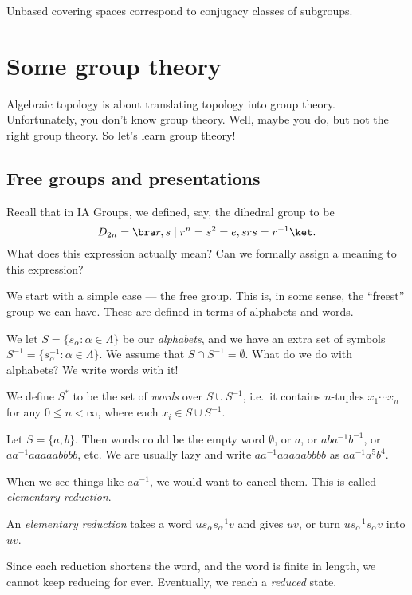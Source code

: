 \documentclass[a4paper]{article}
\begin{document}
\begin{prop}
  Unbased covering spaces correspond to conjugacy classes of subgroups.
\end{prop}

\section{Some group theory}
Algebraic topology is about translating topology into group theory. Unfortunately, you don't know group theory. Well, maybe you do, but not the right group theory. So let's learn group theory!

\subsection{Free groups and presentations}
Recall that in IA Groups, we defined, say, the dihedral group to be
\[
  D_{2n} = \bra r, s \mid r^n = s^2 = e, srs = r^{-1}\ket.
\]
What does this expression actually mean? Can we formally assign a meaning to this expression?

We start with a simple case --- the free group. This is, in some sense, the ``freest'' group we can have. These are defined in terms of alphabets and words.

\begin{defi}
 We let $S = \{s_\alpha: \alpha \in \Lambda\}$ be our \emph{alphabets}, and we have an extra set of symbols $S^{-1} = \{s_\alpha^{-1}: \alpha \in \Lambda\}$. We assume that $S\cap S^{-1} = \emptyset$. What do we do with alphabets? We write words with it!

 We define $S^*$ to be the set of \emph{words} over $S\cup S^{-1}$, i.e.\ it contains $n$-tuples $x_1 \cdots x_n$ for any $0 \leq n < \infty$, where each $x_i \in S \cup S^{-1}$.
\end{defi}

\begin{eg}
  Let $S = \{a, b\}$. Then words could be the empty word $\emptyset$, or $a$, or $aba^{-1}b^{-1}$, or $aa^{-1}aaaaabbbb$, etc. We are usually lazy and write $aa^{-1}aaaaabbbb$ as $aa^{-1}a^5 b^4$.
\end{eg}

When we see things like $aa^{-1}$, we would want to cancel them. This is called \emph{elementary reduction}.
\begin{defi}
  An \emph{elementary reduction} takes a word $us_\alpha s_\alpha^{-1}v$ and gives $uv$, or turn $us_\alpha^{-1}s_\alpha v$ into $uv$.
\end{defi}
Since each reduction shortens the word, and the word is finite in length, we cannot keep reducing for ever. Eventually, we reach a \emph{reduced} state.
\end{document}
